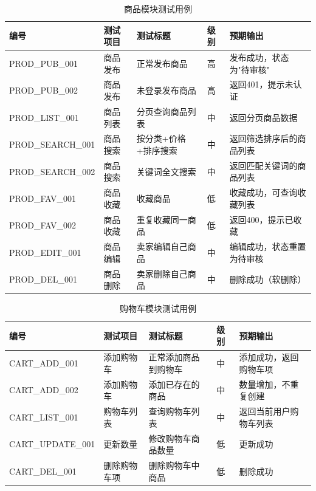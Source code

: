 \documentclass[12pt,a4paper,oneside]{ctexart}
\begin{document}
\begin{table}[htbp]
\centering
\caption{商品模块测试用例}
\label{tab:test-product}
\renewcommand{\arraystretch}{1.1}
\scriptsize
\setlength{\tabcolsep}{3pt}
\begin{tabular}{|p{3.1cm}|p{1.0cm}|p{2.2cm}|p{0.6cm}|p{7.5cm}|}
\hline
\textbf{编号} & \textbf{测试项目} & \textbf{测试标题} & \textbf{级别} & \textbf{预期输出} \\
\hline
PROD\_PUB\_001 & 商品发布 & 正常发布商品 & 高 & 发布成功，状态为"待审核" \\
\hline
PROD\_PUB\_002 & 商品发布 & 未登录发布商品 & 高 & 返回401，提示未认证 \\
\hline
PROD\_LIST\_001 & 商品列表 & 分页查询商品列表 & 中 & 返回分页商品数据 \\
\hline
PROD\_SEARCH\_001 & 商品搜索 & 按分类+价格+排序搜索 & 中 & 返回筛选排序后的商品列表 \\
\hline
PROD\_SEARCH\_002 & 商品搜索 & 关键词全文搜索 & 中 & 返回匹配关键词的商品列表 \\
\hline
PROD\_FAV\_001 & 商品收藏 & 收藏商品 & 低 & 收藏成功，可查询收藏列表 \\
\hline
PROD\_FAV\_002 & 商品收藏 & 重复收藏同一商品 & 低 & 返回400，提示已收藏 \\
\hline
PROD\_EDIT\_001 & 商品编辑 & 卖家编辑自己商品 & 中 & 编辑成功，状态重置为待审核 \\
\hline
PROD\_DEL\_001 & 商品删除 & 卖家删除自己商品 & 中 & 删除成功（软删除） \\
\hline
\hline
\end{tabular}
\end{table}

\begin{table}[htbp]
\centering
\caption{购物车模块测试用例}
\label{tab:test-cart}
\renewcommand{\arraystretch}{1.1}
\scriptsize
\setlength{\tabcolsep}{3pt}
\begin{tabular}{|p{3.1cm}|p{1.0cm}|p{2.2cm}|p{0.6cm}|p{7.5cm}|}
\hline
\textbf{编号} & \textbf{测试项目} & \textbf{测试标题} & \textbf{级别} & \textbf{预期输出} \\
\hline
CART\_ADD\_001 & 添加购物车 & 正常添加商品到购物车 & 中 & 添加成功，返回购物车项 \\
\hline
CART\_ADD\_002 & 添加购物车 & 添加已存在的商品 & 中 & 数量增加，不重复创建 \\
\hline
CART\_LIST\_001 & 购物车列表 & 查询购物车列表 & 中 & 返回当前用户购物车列表 \\
\hline
CART\_UPDATE\_001 & 更新数量 & 修改购物车商品数量 & 低 & 更新成功 \\
\hline
CART\_DEL\_001 & 删除购物车项 & 删除购物车中商品 & 低 & 删除成功 \\
\hline
\hline
\end{tabular}
\end{table}
\end{document}
